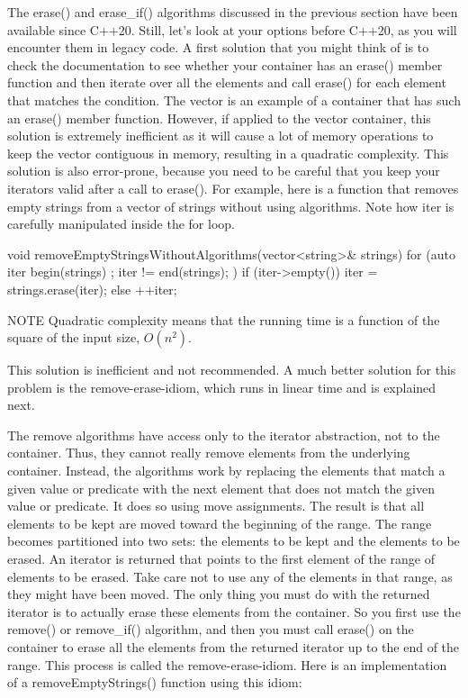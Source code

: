 The erase() and erase\_if() algorithms discussed in the previous section have been available since C++20. Still, let’s look at your options before C++20, as you will encounter them in legacy code. A first solution that you might think of is to check the documentation to see whether your container has an erase() member function and then iterate over all the elements and call erase() for each element that matches the condition. The vector is an example of a container that has such an erase() member function. However, if applied to the vector container, this solution is extremely inefficient as it will cause a lot of memory operations to keep the vector contiguous in memory, resulting in a quadratic complexity. This solution is also error-prone, because you need to be careful that you keep your iterators valid after a call to erase(). For example, here is a function that removes empty strings from a vector of strings without using algorithms. Note how iter is carefully manipulated inside the for loop.

\begin{cpp}
void removeEmptyStringsWithoutAlgorithms(vector<string>& strings)
{
    for (auto iter { begin(strings) }; iter != end(strings); ) {
        if (iter->empty()) {
            iter = strings.erase(iter);
        } else {
            ++iter;
        }
    }
}
\end{cpp}

\begin{myNotic}{NOTE}
Quadratic complexity means that the running time is a function of the square of the input size, $O(n^2)$.
\end{myNotic}

This solution is inefficient and not recommended. A much better solution for this problem is the remove-erase-idiom, which runs in linear time and is explained next.

The remove algorithms have access only to the iterator abstraction, not to the container. Thus, they cannot really remove elements from the underlying container. Instead, the algorithms work by replacing the elements that match a given value or predicate with the next element that does not match the given value or predicate. It does so using move assignments. The result is that all elements to be kept are moved toward the beginning of the range. The range becomes partitioned into two sets: the elements to be kept and the elements to be erased. An iterator is returned that points to the first element of the range of elements to be erased. Take care not to use any of the elements in that range, as they might have been moved. The only thing you must do with the returned iterator is to actually erase these elements from the container. So you first use the remove() or remove\_if() algorithm, and then you must call erase() on the container to erase all the elements from the returned iterator up to the end of the range. This process is called the remove-erase-idiom. Here is an implementation of a removeEmptyStrings() function using this idiom:

